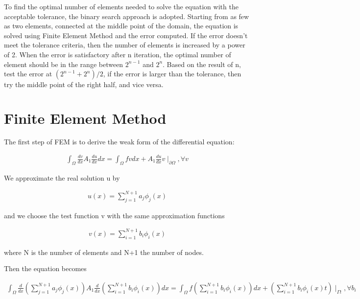 \documentclass[paper=a4, fontsize=11pt]{article} %
\begin{document}
To find the optimal number of elements needed to solve the equation with the acceptable tolerance, the binary search approach is adopted. Starting from as few as two elements, connected at the middle point of the domain, the equation is solved using Finite Element Method and the error computed. If the error doesn't meet the tolerance criteria, then the number of elements is increased by a power of 2. When the error is satisfactory after n iteration, the optimal number of element  should be in the range between $2^{n-1}$ and $2^n$. Based on the result of n, test the error at $(2^{n-1} + 2^n)/2$, if the error is larger than the tolerance, then try the middle point of the right half, and vice versa. 


\section{Finite Element Method}

The first step of FEM is to derive the weak form of the differential equation: 

\begin{eqnarray}
\int_{\Omega} \frac{dv}{dx} A_1 \frac{du}{dx} dx = \int_{\Omega} fv dx + A_1 \frac{du}{dx} v \mid _{\partial \Omega}, \forall v
\end{eqnarray}


We approximate the real solution u by

\begin{eqnarray}
u(x) = \sum_{j=1}^{N+1} a_j \phi_j(x)
\end{eqnarray}

and we choose the test function v with the same approximation functions

\begin{eqnarray}
v(x) = \sum_{i=1}^{N+1} b_i \phi_i(x)
\end{eqnarray}

where N is the number of elements and N+1 the number of nodes. 


Then the equation becomes

\begin{eqnarray}
\int_{\Omega} \frac{d}{dx} (\sum_{j=1}^{N+1} a_j \phi_j(x)) A_1 \frac{d}{dx} (\sum_{i=1}^{N+1} b_i \phi_i(x))dx = \int_{\Omega} f (\sum_{i=1}^{N+1} b_i \phi_i(x)) dx + (\sum_{i=1}^{N+1} b_i \phi_i(x) t) \mid _{\Gamma t}, \forall b_i
\end{eqnarray}
\end{document}
